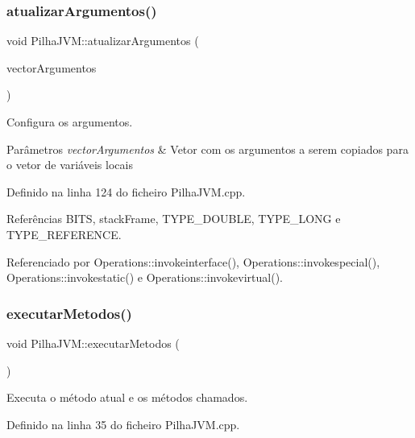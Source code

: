 \subsubsection{\texorpdfstring{atualizar\+Argumentos()}{atualizarArgumentos()}}
{\footnotesize\ttfamily void Pilha\+J\+V\+M\+::atualizar\+Argumentos (\begin{DoxyParamCaption}\item[{vector$<$ \hyperlink{BasicTypes_8h_a97b332303b1262282599e6ede0637b82}{Typed\+Element} $>$}]{vector\+Argumentos }\end{DoxyParamCaption})}



Configura os argumentos. 


\begin{DoxyParams}{Parâmetros}
{\em vector\+Argumentos} & Vetor com os argumentos a serem copiados para o vetor de variáveis locais \\
\hline
\end{DoxyParams}


Definido na linha 124 do ficheiro Pilha\+J\+V\+M.\+cpp.



Referências B\+I\+TS, stack\+Frame, T\+Y\+P\+E\+\_\+\+D\+O\+U\+B\+LE, T\+Y\+P\+E\+\_\+\+L\+O\+NG e T\+Y\+P\+E\+\_\+\+R\+E\+F\+E\+R\+E\+N\+CE.



Referenciado por Operations\+::invokeinterface(), Operations\+::invokespecial(), Operations\+::invokestatic() e Operations\+::invokevirtual().

\mbox{\label{classPilhaJVM_a8c87f8255b289be137dd09360d135e86}} 
\subsubsection{\texorpdfstring{executar\+Metodos()}{executarMetodos()}}
{\footnotesize\ttfamily void Pilha\+J\+V\+M\+::executar\+Metodos (\begin{DoxyParamCaption}{ }\end{DoxyParamCaption})}



Executa o método atual e os métodos chamados. 



Definido na linha 35 do ficheiro Pilha\+J\+V\+M.\+cpp.



